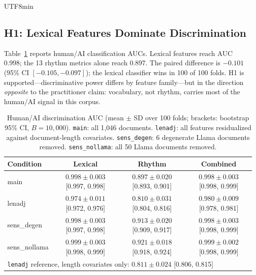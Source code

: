 \documentclass[11pt,a4paper]{article}
\begin{document}
\begin{CJK}{UTF8}{min}
\subsection{H1: Lexical Features Dominate Discrimination}
\label{sec:h1results}

Table~\ref{tab:auc} reports human/AI classification AUCs. Lexical features reach AUC 0.998; the 13 rhythm metrics alone reach 0.897. The paired difference is $-0.101$ (95\% CI $[-0.105, -0.097]$); the lexical classifier wins in 100 of 100 folds. H1 is supported---discriminative power differs by feature family---but in the direction \emph{opposite} to the practitioner claim: vocabulary, not rhythm, carries most of the human/AI signal in this corpus.

\begin{table}[H]
\centering
\caption{Human/AI discrimination AUC (mean $\pm$ SD over 100 folds; brackets: bootstrap 95\% CI, $B=10{,}000$). \texttt{main}: all 1{,}046 documents. \texttt{lenadj}: all features residualized against document-length covariates. \texttt{sens\_degen}: 6 degenerate Llama documents removed. \texttt{sens\_nollama}: all 50 Llama documents removed.}
\label{tab:auc}
\footnotesize
\setlength{\tabcolsep}{4pt}
\begin{tabular}{lccc}
\toprule
Condition & Lexical & Rhythm & Combined \\
\midrule
main & $0.998 \pm 0.003$ [0.997, 0.998] & $0.897 \pm 0.020$ [0.893, 0.901] & $0.998 \pm 0.003$ [0.998, 0.999] \\
lenadj & $0.974 \pm 0.011$ [0.972, 0.976] & $0.810 \pm 0.031$ [0.804, 0.816] & $0.980 \pm 0.009$ [0.978, 0.981] \\
sens\_degen & $0.998 \pm 0.003$ [0.997, 0.998] & $0.913 \pm 0.020$ [0.909, 0.917] & $0.998 \pm 0.003$ [0.998, 0.999] \\
sens\_nollama & $0.999 \pm 0.003$ [0.998, 0.999] & $0.921 \pm 0.018$ [0.918, 0.924] & $0.999 \pm 0.002$ [0.998, 0.999] \\
\midrule
\multicolumn{4}{l}{\texttt{lenadj} reference, length covariates only: $0.811 \pm 0.024$ [0.806, 0.815]} \\
\bottomrule
\end{tabular}
\end{table}


\end{CJK}
\end{document}
